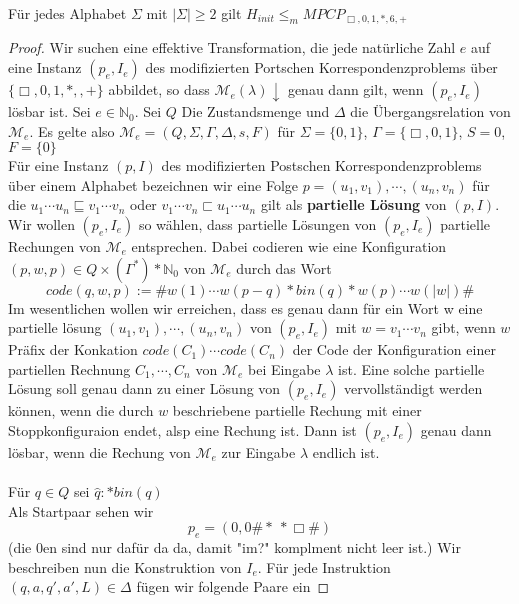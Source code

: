     Für jedes Alphabet \(\Sigma\) mit \(|\Sigma| \geq 2\) gilt \(H_{init} \leq_m MPCP_{\Box, 0, 1, *, 6, +}\)

    \begin{proof}
      Wir suchen eine effektive Transformation, die jede natürliche Zahl \(e\) auf eine Instanz \((p_e,I_e)\) des modifizierten Portschen Korrespondenzproblems über \(\{\Box, 0, 1, *, , +\}\) abbildet, so dass \(\mathcal{M} _e(\lambda)\downarrow\) genau dann gilt, wenn \((p_e, I_e)\) lösbar ist. Sei \(e \in \mathbb{N}_0\). Sei \(Q\) Die Zustandsmenge und \(\Delta\) die Übergangsrelation von \(\mathcal{M}_e\). Es gelte also \(\mathcal{M}_e = (Q, \Sigma, \Gamma, \Delta, s, F)\) für \(\Sigma = \{0, 1\}\), \(\Gamma = \{\Box, 0, 1\}\), \(S = 0\), \(F = \{0\}\) \\ Für eine Instanz \((p, I)\) des modifizierten Postschen Korrespondenzproblems über einem Alphabet bezeichnen wir eine Folge \(p =  (u_1, v_1), \cdots, (u_n, v_n)\) für die \(u_1 \cdots u_n \sqsubseteq v_1 \cdots v_n\) oder \(v_1 \cdots v_n \sqsubset u_1 \cdots u_n\) gilt als \textbf{partielle Lösung} von \((p, I)\). Wir wollen \((p_e, I_e)\) so wählen, dass partielle Lösungen von \((p_e, I_e)\) partielle Rechungen von \(\mathcal{M}_e\) entsprechen. Dabei codieren wie eine Konfiguration \((p, w, p) \in Q \times(\Gamma^*)*\mathbb{N}_0\) von \(\mathcal{M}_e\) durch das Wort 
      \[
        code (q, w, p) := \# w(1)\cdots w(p-q) * bin(q)* w(p) \cdots w(|w|)\#
      \]
      Im wesentlichen wollen wir erreichen, dass es genau dann für ein Wort w eine partielle lösung  \((u_1, v_1), \cdots, (u_n, v_n)\) von \((p_e, I_e)\) mit \(w = v_1 \cdots v_n\) gibt, wenn \(w\) Präfix der Konkation \(code (C_1) \cdots code (C_n)\) der Code der Konfiguration einer partiellen Rechnung \(C_1, \cdots, C_n\) von \(\mathcal{M}_e\) bei Eingabe \(\lambda\) ist. Eine solche partielle Lösung soll genau dann zu einer Lösung von \((p_e, I_e)\) vervollständigt werden können, wenn die durch \(w\) beschriebene partielle Rechung mit einer Stoppkonfiguraion endet, alsp eine Rechung ist. Dann ist \((p_e, I_e)\) genau dann lösbar, wenn die Rechung von \(\mathcal{M}_e\) zur Eingabe \(\lambda\) endlich ist. \\\\ Für \(q \in Q\) sei \(\hat{q} : * bin(q)\)\\ Als Startpaar sehen wir 
      \[
        p_e = (0, 0 \# * \ *\Box\#)
      \]
      (die 0en sind nur dafür da da, damit "im?" komplment nicht leer ist.) Wir beschreiben nun die Konstruktion von \(I_e\). Für jede Instruktion \((q, a, q', a', L) \in \Delta\) fügen wir folgende Paare ein 

\end{proof}
